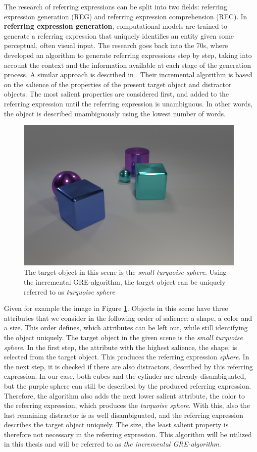 The research of referring expressions can be split into two fields: referring expression generation (REG) and referring expression comprehension (REC).
In \textbf{referring expression generation}, computational models are trained to generate a referring expression that uniquely identifies an entity given some perceptual, often visual input.
The research goes back into the 70s, where \citet{Winograd1972} developed an algorithm to generate referring expressions step by step, taking into account the context and the information available at each stage of the generation process.
A similar approach is described in \citep{Dale1995}.
Their incremental algorithm is based on the salience of the properties of the present target object and distractor objects.
The most salient properties are considered first, and added to the referring expression until the referring expression is unambiguous.
In other words, the object is described unambiguously using the lowest number of words.

\begin{figure}[ht]
    \centering
    \includegraphics[width=0.5\linewidth]{figures/CLEVR_dale-5.png}
    \caption{The target object in this scene is the \emph{small turquoise sphere}. Using the incremental GRE-algorithm, the target object can be uniquely referred to as \emph{turquoise sphere}}
    \label{fig:incremental-algorithm}
\end{figure}

Given for example the image in Figure \ref{fig:incremental-algorithm}.
Objects in this scene have three attributes that we consider in the following order of salience: a shape, a color and a size.
This order defines, which attributes can be left out, while still identifying the object uniquely.
The target object in the given scene is the \emph{small turquoise sphere}.
In the first step, the attribute with the highest salience, the shape, is selected from the target object.
This produces the referring expression \emph{sphere}.
In the next step, it is checked if there are also distractors, described by this referring expression.
In our case, both cubes and the cylinder are already disambiguated, but the purple sphere can still be described by the produced referring expression.
Therefore, the algorithm also adds the next lower salient attribute, the color to the referring expression, which produces the \emph{turquoise sphere}.
With this, also the last remaining distractor is as well disambiguated, and the referring expression describes the target object uniquely.
The size, the least salient property is therefore not necessary in the referring expression.
This algorithm will be utilized in this thesis and will be referred to as \emph{the incremental GRE-algorithm}.

